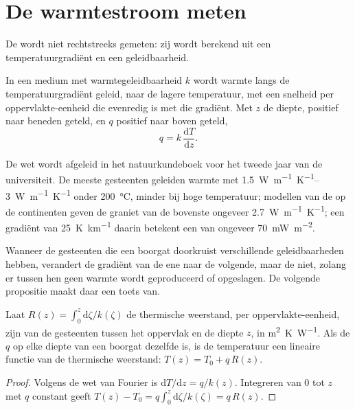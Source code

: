 \section{De warmtestroom meten}

De  wordt niet rechtstreeks gemeten: zij wordt berekend uit een temperatuurgradiënt en een geleidbaarheid.

\begin{proposition}\label{prop:b1:heat-budget:fourier}
In een medium met warmtegeleidbaarheid $k$ wordt warmte langs de temperatuurgradiënt geleid, naar de lagere temperatuur, met een snelheid per oppervlakte-eenheid die evenredig is met die gradiënt. Met $z$ de diepte, positief naar beneden geteld, en $q$ positief naar boven geteld,
\[
  q = k\,\frac{\mathrm dT}{\mathrm dz} .
\]
\end{proposition}
\admitted

De wet wordt afgeleid in het natuurkundeboek voor het tweede jaar van de universiteit. De meeste gesteenten geleiden warmte met \qtyrange{1.5}{3}{W.m^{-1}.K^{-1}} onder \qty{200}{\celsius}, minder bij hoge temperatuur; modellen van de  op de continenten geven de graniet van de bovenste  ongeveer \qty{2.7}{W.m^{-1}.K^{-1}};
een gradiënt van \qty{25}{K.km^{-1}} daarin betekent een  van ongeveer \qty{70}{mW.m^{-2}}.

Wanneer de gesteenten die een boorgat doorkruist verschillende geleidbaarheden hebben, verandert de gradiënt van de ene naar de volgende, maar de  niet, zolang er tussen hen geen warmte wordt geproduceerd of opgeslagen. De volgende propositie maakt daar een toets van.

\begin{proposition}\label{prop:b1:heat-budget:bullard}
Laat $R(z) = \int_0^z \mathrm d\zeta/k(\zeta)$ de thermische weerstand, per oppervlakte-eenheid, zijn van de gesteenten tussen het oppervlak en de diepte $z$, in \unit{m^2.K.W^{-1}}. Als de  $q$ op elke diepte van een boorgat dezelfde is, is de temperatuur een lineaire functie van de thermische weerstand:
$T(z) = T_0 + q\,R(z)$.
\end{proposition}

\begin{proof}
Volgens de wet van Fourier is $\mathrm dT/\mathrm dz = q/k(z)$. Integreren van $0$ tot $z$ met $q$ constant geeft $T(z) - T_0 = q\int_0^z \mathrm d\zeta/k(\zeta) = q\,R(z)$.
\end{proof}

